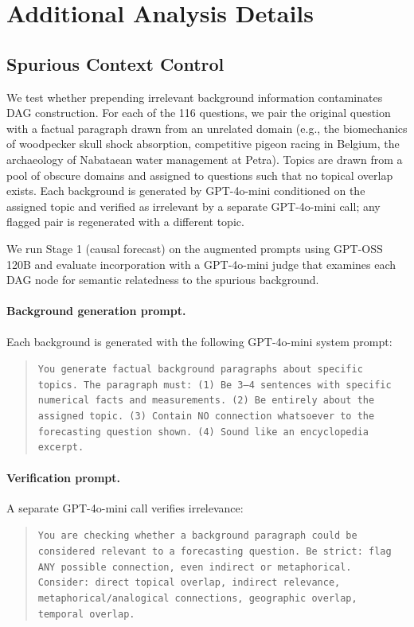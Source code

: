 \documentclass[11pt]{article}
\begin{document}
\section{Additional Analysis Details}
\label{app:additional}

\subsection{Spurious Context Control}

We test whether prepending irrelevant background information contaminates DAG construction. For each of the 116 questions, we pair the original question with a factual paragraph drawn from an unrelated domain (e.g., the biomechanics of woodpecker skull shock absorption, competitive pigeon racing in Belgium, the archaeology of Nabataean water management at Petra). Topics are drawn from a pool of obscure domains and assigned to questions such that no topical overlap exists. Each background is generated by GPT-4o-mini conditioned on the assigned topic and verified as irrelevant by a separate GPT-4o-mini call; any flagged pair is regenerated with a different topic.

We run Stage 1 (causal forecast) on the augmented prompts using GPT-OSS 120B and evaluate incorporation with a GPT-4o-mini judge that examines each DAG node for semantic relatedness to the spurious background.

\paragraph{Background generation prompt.} Each background is generated with the following GPT-4o-mini system prompt:

\begin{quote}
\small
\texttt{You generate factual background paragraphs about specific topics. The paragraph must: (1) Be 3--4 sentences with specific numerical facts and measurements. (2) Be entirely about the assigned topic. (3) Contain NO connection whatsoever to the forecasting question shown. (4) Sound like an encyclopedia excerpt.}
\end{quote}

\paragraph{Verification prompt.} A separate GPT-4o-mini call verifies irrelevance:

\begin{quote}
\small
\texttt{You are checking whether a background paragraph could be considered relevant to a forecasting question. Be strict: flag ANY possible connection, even indirect or metaphorical. Consider: direct topical overlap, indirect relevance, metaphorical/analogical connections, geographic overlap, temporal overlap.}
\end{quote}
\end{document}
